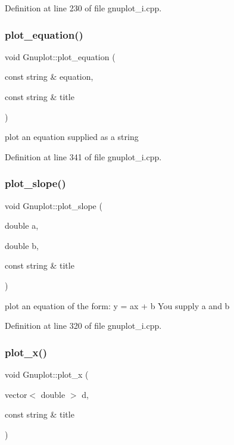 Definition at line 230 of file gnuplot\+\_\+i.\+cpp.

\mbox{\label{class_gnuplot_a55e6430f1329bf8a66f155dcacb9d112}} 
\subsubsection{\texorpdfstring{plot\+\_\+equation()}{plot\_equation()}}
{\footnotesize\ttfamily void Gnuplot\+::plot\+\_\+equation (\begin{DoxyParamCaption}\item[{const string \&}]{equation,  }\item[{const string \&}]{title }\end{DoxyParamCaption})}



plot an equation supplied as a string 



Definition at line 341 of file gnuplot\+\_\+i.\+cpp.

\mbox{\label{class_gnuplot_a80c9d9e6bc3e64db073d9d39d6ec5d5f}} 
\subsubsection{\texorpdfstring{plot\+\_\+slope()}{plot\_slope()}}
{\footnotesize\ttfamily void Gnuplot\+::plot\+\_\+slope (\begin{DoxyParamCaption}\item[{double}]{a,  }\item[{double}]{b,  }\item[{const string \&}]{title }\end{DoxyParamCaption})}

plot an equation of the form\+: y = ax + b You supply a and b 

Definition at line 320 of file gnuplot\+\_\+i.\+cpp.

\mbox{\label{class_gnuplot_ae3b7c28efb53f636431b9655085906be}} 
\subsubsection{\texorpdfstring{plot\+\_\+x()}{plot\_x()}}
{\footnotesize\ttfamily void Gnuplot\+::plot\+\_\+x (\begin{DoxyParamCaption}\item[{vector$<$ double $>$}]{d,  }\item[{const string \&}]{title }\end{DoxyParamCaption})}



